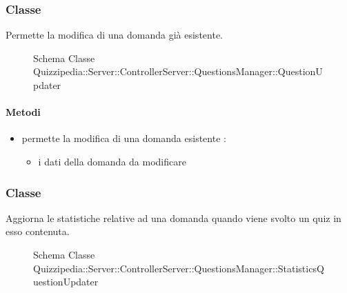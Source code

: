 \subsubsection{Classe }
Permette la modifica di una domanda già esistente.
\begin{figure}[H]
\centering
\noindent{}
\caption[Schema Classe QuestionUpdater]{Schema Classe Quizzipedia::Server::ControllerServer::QuestionsManager::QuestionUpdater}
\end{figure}
\paragraph{Metodi}
\begin{itemize}
\item {}
\newline
permette la modifica di una domanda esistente
\newline
{} :
\begin{itemize}
\item {}
\newline
i dati della domanda da modificare
\end{itemize}
\end{itemize}
\subsubsection{Classe }
Aggiorna le statistiche relative ad una domanda quando viene svolto un quiz in esso contenuta.
\begin{figure}[H]
\centering
\noindent{}
\caption[Schema Classe StatisticsQuestionUpdater]{Schema Classe Quizzipedia::Server::ControllerServer::QuestionsManager::StatisticsQuestionUpdater}
\end{figure}
